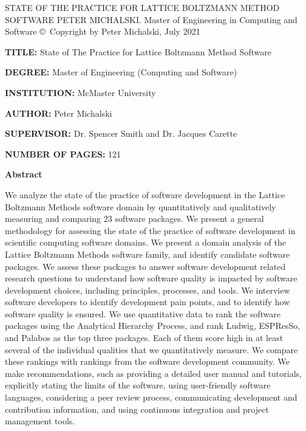 \documentclass[12pt, notitlepage]{article}
\newcommand{\fulltitle}{State of the Practice for Lattice Boltzmann Method Software}
\newcommand{\authorname}{Peter Michalski}
\begin{document}
\begin{singlespace}

\thesistitle
	{\MakeUppercase{\fulltitle}}
	{\MakeUppercase{\authorname}.}
	{Master of Engineering in Computing and Software}
	{\copyright \ Copyright by \authorname, July 2021}

\newpage
\thispagestyle{empty}

\noindent\textbf{TITLE:} State of The Practice for Lattice Boltzmann Method Software

\noindent\textbf{DEGREE:} Master of Engineering (Computing and Software)

\noindent\textbf{INSTITUTION:} McMaster University

\noindent\textbf{AUTHOR:} Peter Michalski

\noindent\textbf{SUPERVISOR:} Dr. Spencer Smith and Dr. Jacques Carette

\noindent\textbf{NUMBER OF PAGES:} 121


\newpage
\thispagestyle{empty}
\begin{center}
	\textbf{\large Abstract}
\end{center}

We analyze the state of the practice of software development in the Lattice Boltzmann Methods software domain by quantitatively and qualitatively measuring and comparing 23 software packages. We present a general methodology for assessing the state of the practice of software development in scientific computing software domains. We present a domain analysis of the Lattice Boltzmann Methods software family, and identify candidate software packages. We assess these packages to answer software development related research questions to understand how software quality is impacted by software development choices, including principles, processes, and tools. We interview software developers to identify development pain points, and to identify how software quality is ensured. We use quantitative data to rank the software packages using the Analytical Hierarchy Process, and rank Ludwig, ESPResSo, and Palabos as the top three packages. Each of them score high in at least several of the individual qualities that we quantitatively measure. We compare these rankings with rankings from the software development community. We make recommendations, such as providing a detailed user manual and tutorials, explicitly stating the limits of the software, using user-friendly software languages, considering a peer review process, communicating development and contribution information, and using continuous integration and project management tools.\\ 


\end{singlespace}
\end{document}
